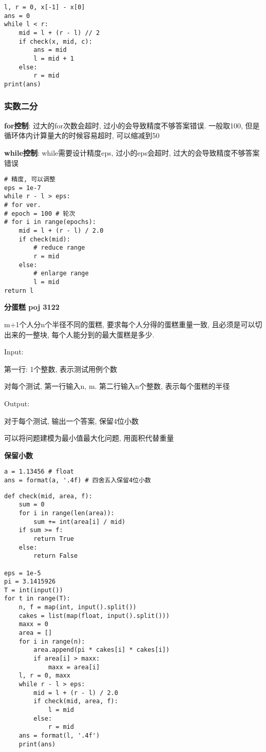 \documentclass[../main]{subfiles}
\begin{document}
\begin{sloppy}
\begin{lstlisting}[style = Python]
l, r = 0, x[-1] - x[0]
ans = 0
while l < r:
    mid = l + (r - l) // 2
    if check(x, mid, c):
        ans = mid
        l = mid + 1
    else:
        r = mid
print(ans)
\end{lstlisting}

\subsubsection{实数二分}

\textbf{for控制}: 过大的for次数会超时, 过小的会导致精度不够答案错误. 一般取100, 但是循环体内计算量大的时候容易超时, 可以缩减到50

\textbf{while控制}: while需要设计精度eps, 过小的eps会超时, 过大的会导致精度不够答案错误

\begin{lstlisting}[style = Python]
# 精度, 可以调整
eps = 1e-7
while r - l > eps:
# for ver.
# epoch = 100 # 轮次
# for i in range(epochs):
    mid = l + (r - l) / 2.0
    if check(mid):
        # reduce range
        r = mid
    else:
        # enlarge range
        l = mid
return l
\end{lstlisting}

\newpage

\textbf{分蛋糕 poj 3122}

m+1个人分n个半径不同的蛋糕, 要求每个人分得的蛋糕重量一致, 且必须是可以切出来的一整块, 每个人能分到的最大蛋糕是多少.

Input:

第一行: 1个整数, 表示测试用例个数

对每个测试, 第一行输入n, m. 第二行输入n个整数, 表示每个蛋糕的半径

Output:

对于每个测试, 输出一个答案, 保留4位小数

可以将问题建模为最小值最大化问题, 用面积代替重量

\textbf{保留小数}

\begin{lstlisting}[style = Python]
a = 1.13456 # float
ans = format(a, '.4f) # 四舍五入保留4位小数
\end{lstlisting}

\begin{lstlisting}[style = Python]
def check(mid, area, f):
    sum = 0
    for i in range(len(area)):
        sum += int(area[i] / mid)
    if sum >= f:
        return True
    else:
        return False

eps = 1e-5
pi = 3.1415926
T = int(input())
for t in range(T):
    n, f = map(int, input().split())
    cakes = list(map(float, input().split()))
    maxx = 0
    area = []
    for i in range(n):
        area.append(pi * cakes[i] * cakes[i])
        if area[i] > maxx:
            maxx = area[i]
    l, r = 0, maxx
    while r - l > eps:
        mid = l + (r - l) / 2.0
        if check(mid, area, f):
            l = mid
        else:
            r = mid
    ans = format(l, '.4f')
    print(ans)
\end{lstlisting}


\end{sloppy}
\end{document}

